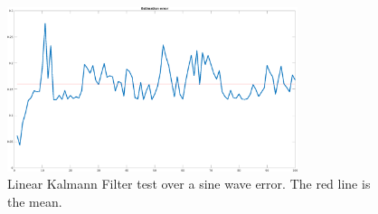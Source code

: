 \documentclass[twocolumn, a4paper]{article}
\begin{document}
\begin{figure}[h]
    \centering
    \includegraphics[width=8.5cm]{"../Report_images/Denoising_KF_sine_error"}
    \caption{Linear Kalmann Filter test over a sine wave error. The red line is
             the mean.}
    \label{fig:KF_sine_err}
\end{figure}
\end{document}
